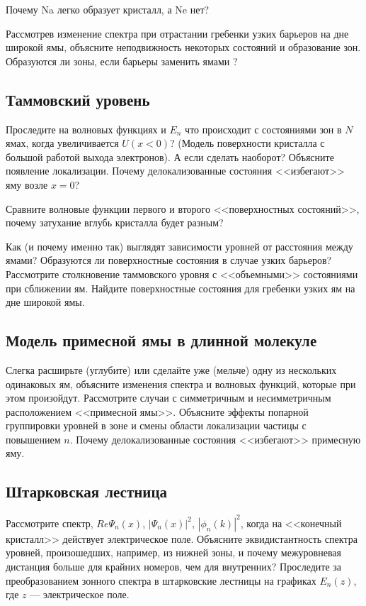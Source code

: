 \documentclass[12pt]{article}
\begin{document}
Почему Na легко образует кристалл, а Ne нет?

Рассмотрев изменение спектра  при отрастании гребенки узких
барьеров  на   дне  широкой  ямы,   объясните  неподвижность
некоторых состояний и образование зон. Образуются ли зоны,
если барьеры заменить ямами ?

\hypertarget{Tamm_state}{}\subsection{Таммовский уровень}
Проследите на волновых функциях и $E_n$ что происходит с
состояниями зон в $N$ ямах, когда увеличивается $U(x<0)$? (Модель
поверхности кристалла с большой работой выхода электронов). А
если сделать наоборот? Объясните появление локализации.
Почему
делокализованные состояния <<избегают>> яму возле $x=0$?

Сравните
волновые функции  первого и второго <<поверхностных состояний>>,
почему затухание вглубь кристалла будет разным?

Как (и почему именно так) выглядят зависимости уровней от
расстояния между ямами? Образуются  ли  поверхностные   состояния
в случае узких барьеров?  Рассмотрите  столкновение  таммовского
уровня с <<объемными>> состояниями при сближении ям. Найдите
поверхностные состояния для гребенки узких ям на дне широкой
ямы.


\hypertarget{Impur_state}{}\subsection{Модель примесной ямы в
длинной молекуле}
Слегка  расширьте (углубите)  или  сделайте  уже (мельче)
одну  из  нескольких одинаковых ям,  объясните изменения спектра
и волновых функций, которые при этом произойдут. Рассмотрите
случаи с симметричным и несимметричным  расположением  <<примесной
ямы>>. Объясните эффекты  попарной группировки  уровней  в  зоне и
смены области локализации частицы с повышением $n$.
Почему делокализованные состояния <<избегают>> примесную яму.

\hypertarget{Stark_state}{}\subsection{Штарковская лестница}
Рассмотрите спектр, $Re\Psi_n(x)$, $|\Psi_n(x)|^2$, $|\phi_n(k)|
^2$, когда на <<конечный кристалл>> действует электрическое поле.
Объясните эквидистантность спектра уровней, произошедших,
например, из нижней зоны, и почему межуровневая дистанция
больше для крайних номеров, чем для внутренних? Проследите
за преобразованием зонного спектра в штарковские лестницы на
графиках $E_n(z)$, где $z$ --- электрическое поле.
\end{document}

